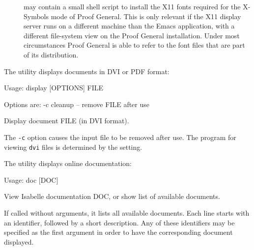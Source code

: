 \begin{isabellebody}
\begin{isamarkuptext}
\begin{description}
  \item[\hypertarget{setting.XSYMBOL-INSTALLFONTS}{\hyperlink{setting.XSYMBOL-INSTALLFONTS}{\mbox{}}}] may contain a small shell
  script to install the X11 fonts required for the X-Symbols mode of
  Proof General.  This is only relevant if the X11 display server runs
  on a different machine than the Emacs application, with a different
  file-system view on the Proof General installation.  Under most
  circumstances Proof General is able to refer to the font files that
  are part of its distribution.

  \end{description}%
\end{isamarkuptext}%
\isamarkuptrue%
%
\isamarkuptrue%
%
\begin{isamarkuptext}%
The \hypertarget{tool.display}{\hyperlink{tool.display}{\mbox{}}} utility displays documents in DVI or PDF
  format:
\begin{ttbox}
Usage: display [OPTIONS] FILE

  Options are:
    -c           cleanup -- remove FILE after use

  Display document FILE (in DVI format).
\end{ttbox}

  \medskip The \verb|-c| option causes the input file to be
  removed after use.  The program for viewing \verb|dvi| files is
  determined by the \hyperlink{setting.DVI-VIEWER}{\mbox{}} setting.%
\end{isamarkuptext}%
\isamarkuptrue%
%
\isamarkuptrue%
%
\begin{isamarkuptext}%
The \hypertarget{tool.doc}{\hyperlink{tool.doc}{\mbox{}}} utility displays online documentation:
\begin{ttbox}
Usage: doc [DOC]

  View Isabelle documentation DOC, or show list of available documents.
\end{ttbox}
  If called without arguments, it lists all available documents. Each
  line starts with an identifier, followed by a short description. Any
  of these identifiers may be specified as the first argument in order
  to have the corresponding document displayed.


\end{isamarkuptext}
\end{isabellebody}
